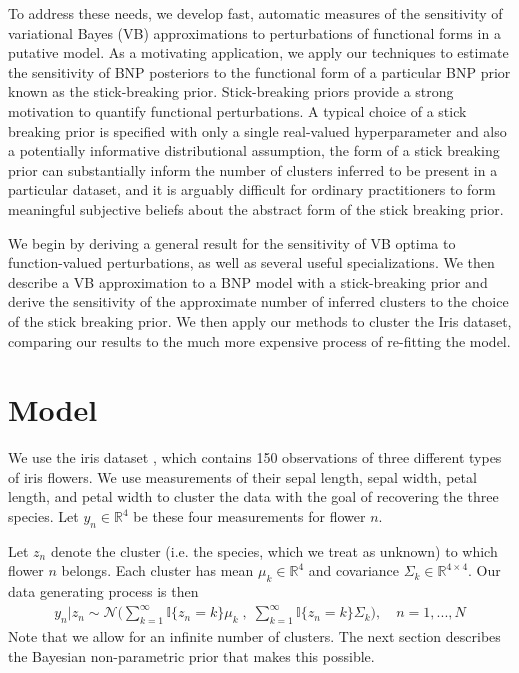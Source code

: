 \documentclass[a4paper]{article}
\begin{document}
To address these needs, we develop fast, automatic measures of the sensitivity of
variational Bayes (VB) approximations to perturbations of functional forms in a putative model.
As a motivating application, we apply our techniques to estimate the sensitivity of BNP posteriors
to the functional form of a particular BNP prior known as the stick-breaking prior.
Stick-breaking priors provide a strong motivation to
quantify functional perturbations. A typical choice of a stick breaking prior is
specified with only a single real-valued hyperparameter and also a potentially
informative distributional assumption, the form of a stick breaking prior can
substantially inform the number of clusters inferred to be present in a particular
dataset, and it is arguably difficult for ordinary practitioners to form meaningful
subjective beliefs about the abstract form of the stick breaking prior.

We begin by deriving a general result for the sensitivity of VB optima to
function-valued perturbations, as well as several useful specializations.
We then describe a VB approximation to a BNP model with a stick-breaking prior and
derive the sensitivity of the approximate number of inferred clusters to the choice of the stick breaking prior.
We then apply our methods to cluster the Iris \cite{iris_data_anderson, iris_data_fisher} dataset,
comparing our results to the much more expensive process of re-fitting the model.

\section{Model}
We use the iris dataset \cite{iris_data_anderson, iris_data_fisher}, which contains 150 observations of
three different types of iris flowers.
We use measurements of their
sepal length, sepal width, petal length, and petal width to cluster the data with
the goal of recovering the three species. Let $y_{n}\in \mathbb{R}^4$ be these four
measurements for flower $n$.

Let $z_n$ denote the cluster (i.e. the species, which we treat as unknown)
to which flower $n$ belongs.
Each cluster has mean $\mu_k\in \mathbb{R}^4$ and covariance $\Sigma_k \in \mathbb{R}^{4\times 4}$.
Our data generating process is then
\begin{align}
	y_n | z_n \sim \mathcal{N}\Big(\sum_{k=1}^\infty \mathbb{I}\{z_n = k\} \mu_k \;,
              \; \sum_{k=1}^\infty \mathbb{I}\{z_n = k\} \Sigma_k\Big),
	\quad n = 1, ..., N
\end{align}
Note that we allow for an infinite number of clusters. The next section describes
the Bayesian non-parametric prior that makes this possible.
\end{document}
